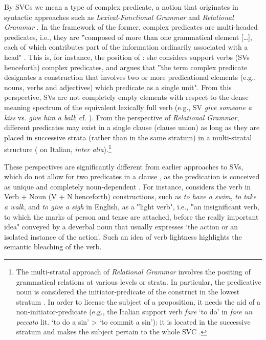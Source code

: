 \documentclass[output=paper,colorlinks,citecolor=brown]{langscibook}
\begin{document}
By SVCs we mean a type of complex predicate, a notion that originates in syntactic approaches such as \textit{Lexical-Functional Grammar} \citep{Bresnan1982, Bresnan2001} and \textit{Relational Grammar} \citep{Perlmutter1974}. In the framework of the former, complex predicates are multi-headed predicates, i.e., they are ‟composed of more than one grammatical element [\ldots{}], each of which contributes part of the information ordinarily associated with a head" \citep[1]{Alsina1997}. This is, for instance, the position of \citet[49]{Butt2010}: she considers support verbs (SVs henceforth) complex predicates, and argues that ‟the term complex predicate designates a construction that involves two or more predicational elements (e.g., nouns, verbs and adjectives) which predicate as a single unit". From this perspective, SVs are not completely empty elements with respect to the dense meaning spectrum of the equivalent lexically full verb (e.g., SV \textit{give someone a kiss} vs. \textit{give him a ball}; cf. \citealt[326; 339--340]{Butt2001}). From the perspective of \textit{Relational Grammar}, different predicates may exist in a single clause (clause union) as long as they are placed in successive strata (rather than in the same stratum) in a multi-stratal structure (\citealt[45--59]{LaFauci2003} on Italian, \textit{inter alia}).\footnote{The multi-stratal approach of \textit{Relational Grammar} involves the positing of grammatical relations at various levels or strata. In particular, the predicative noun is considered the initiator-predicate of the construct in the lowest stratum \citep[45--59]{LaFauci2003}. In order to license the subject of a proposition, it needs the aid of a non-initiator-predicate (e.g., the Italian support verb \textit{fare} `to do' in \textit{fare un peccato} lit. `to do a sin' > `to commit a sin'): it is located in the successive stratum and makes the subject pertain to the whole SVC \citep[46]{LaFauci2003}.} 


These perspectives are significantly different from earlier approaches to SVs, which do not allow for two predicates in a clause \citep[55]{Gross1996}, as the predication is conceived as unique and completely noun-dependent \citep[167]{Grossintro2004}. For instance, \citet[117]{Jespersen1942} considers the verb in Verb + Noun (V + N henceforth) constructions, such as \textit{to have a swim}, \textit{to take a walk}, and \textit{to give a sigh} in English, as a ‟light verb", i.e., ‟an insignificant verb, to which the marks of person and tense are attached, before the really important idea" conveyed by a deverbal noun that usually expresses `the action or an isolated instance of the action'. Such an idea of verb lightness highlights the semantic bleaching of the verb. 
\end{document}
